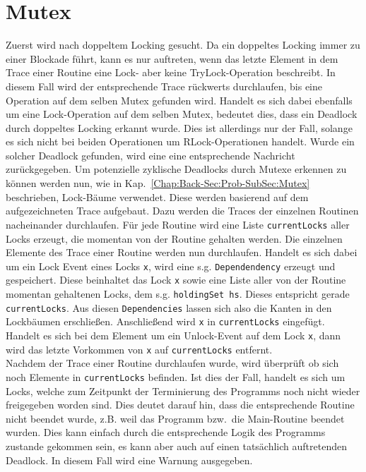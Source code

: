 \section{Mutex} \label{Chap:Implement-Sec:Mutex}
Zuerst wird nach doppeltem Locking gesucht. Da ein doppeltes Locking immer 
zu einer Blockade führt, kann es nur auftreten, wenn das letzte Element in 
dem Trace einer Routine eine Lock- aber keine TryLock-Operation beschreibt. In diesem Fall wird 
der entsprechende Trace rückwerts durchlaufen, bis eine Operation auf dem 
selben Mutex gefunden wird. Handelt es sich dabei ebenfalls um eine 
Lock-Operation auf dem selben Mutex, bedeutet dies, dass ein Deadlock durch 
doppeltes Locking erkannt wurde. Dies ist allerdings nur der Fall, solange es 
sich nicht bei beiden Operationen um RLock-Operationen handelt. Wurde ein 
solcher Deadlock gefunden, wird eine eine entsprechende Nachricht zurückgegeben. 
Um potenzielle zyklische Deadlocks durch Mutexe erkennen zu können werden nun, wie in 
Kap.~\ref{Chap:Back-Sec:Prob-SubSec:Mutex} beschrieben, Lock-Bäume verwendet.
Diese werden basierend auf dem aufgezeichneten Trace aufgebaut. Dazu werden die Traces der 
einzelnen Routinen nacheinander durchlaufen. Für jede Routine wird eine Liste \texttt{currentLocks} aller 
Locks erzeugt, die momentan von der Routine gehalten werden. Die einzelnen Elemente des Trace einer 
Routine werden nun durchlaufen. Handelt es sich dabei um ein Lock Event eines Locks \texttt{x}, 
wird eine s.g. \texttt{Dependendency} erzeugt und gespeichert. Diese beinhaltet 
das Lock \texttt{x} sowie eine Liste aller von der Routine momentan gehaltenen 
Locks, dem s.g. \texttt{holdingSet hs}. Dieses entspricht gerade \texttt{currentLocks}. 
Aus diesen \texttt{Dependencies} lassen sich also die Kanten in den Lockbäumen erschließen.
Anschließend wird \texttt{x} in \texttt{currentLocks} eingefügt.
Handelt es sich bei dem Element um ein Unlock-Event auf dem Lock \texttt{x}, dann wird das 
letzte Vorkommen von \texttt{x} auf \texttt{currentLocks} entfernt.\\
Nachdem der Trace einer Routine durchlaufen wurde, wird überprüft ob sich noch Elemente in 
\texttt{currentLocks} befinden. Ist dies der Fall, handelt es sich um Locks, welche zum Zeitpunkt der Terminierung 
des Programms noch nicht wieder freigegeben worden sind. Dies deutet darauf hin, dass die
entsprechende Routine nicht beendet wurde, z.B. weil das Programm bzw.\ die Main-Routine beendet wurden.
Dies kann einfach durch die entsprechende Logik des Programms zustande gekommen sein, es kann aber auch 
auf einen tatsächlich auftretenden Deadlock. In diesem Fall wird eine Warnung ausgegeben.\\
